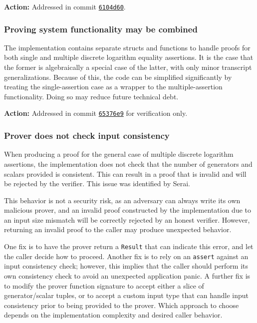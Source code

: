 \documentclass{article}
\begin{document}
\textbf{Action:} Addressed in commit \href{https://github.com/serai-dex/serai/commit/6104d606becf133a69f7a790b5b6462c65f6fd4a}{\texttt{6104d60}}.


\subsubsection{Proving system functionality may be combined}

The implementation contains separate structs and functions to handle proofs for both single and multiple discrete logarithm equality assertions.
It is the case that the former is algebraically a special case of the latter, with only minor transcript generalizations.
Because of this, the code can be simplified significantly by treating the single-assertion case as a wrapper to the multiple-assertion functionality.
Doing so may reduce future technical debt.

\textbf{Action:} Addressed in commit \href{https://github.com/serai-dex/serai/commit/65376e93e5d077d90348d531b911ee22ded411b3}{\texttt{65376e9}} for verification only.


\subsubsection{Prover does not check input consistency}

When producing a proof for the general case of multiple discrete logarithm assertions, the implementation does not check that the number of generators and scalars provided is consistent.
This can result in a proof that is invalid and will be rejected by the verifier.
This issue was identified by Serai.

This behavior is not a security risk, as an adversary can always write its own malicious prover, and an invalid proof constructed by the implementation due to an input size mismatch will be correctly rejected by an honest verifier.
However, returning an invalid proof to the caller may produce unexpected behavior.

One fix is to have the prover return a \texttt{Result} that can indicate this error, and let the caller decide how to proceed.
Another fix is to rely on an \texttt{assert} against an input consistency check; however, this implies that the caller should perform its own consistency check to avoid an unexpected application panic.
A further fix is to modify the prover function signature to accept either a slice of generator/scalar tuples, or to accept a custom input type that can handle input consistency prior to being provided to the prover.
Which approach to choose depends on the implementation complexity and desired caller behavior.
\end{document}
